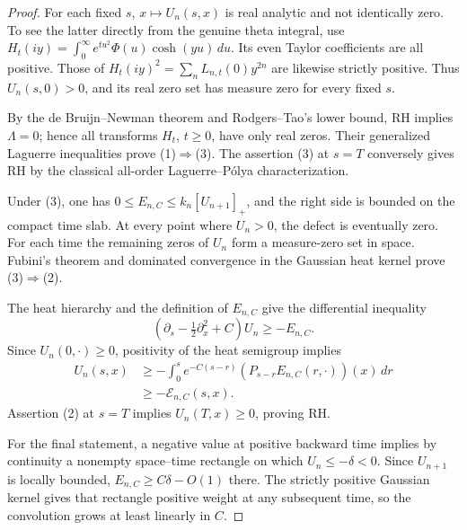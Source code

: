 \begin{proof}
For each fixed $s$, $x\mapsto U_n(s,x)$
is real analytic and not identically zero.
To see the latter directly from the genuine
theta integral, use
$H_t(iy)=\int_0^\infty e^{tu^2}\Phi(u)
\cosh(yu)\,du$. Its even Taylor coefficients
are all positive. Those of
$H_t(iy)^2=\sum_nL_{n,t}(0)y^{2n}$
are likewise strictly positive. Thus
$U_n(s,0)>0$, and its real zero set
has measure zero for every fixed $s$.

By the de Bruijn--Newman theorem and
Rodgers--Tao's lower bound, RH implies
$\Lambda=0$; hence all transforms
$H_t$, $t\ge0$, have only real zeros.
Their generalized Laguerre
inequalities prove (1)$\Rightarrow$(3).
The assertion (3) at $s=T$ conversely
gives RH by the classical all-order
Laguerre--P\'olya characterization.

Under (3), one has
$0\le E_{n,C}\le k_n[U_{n+1}]_+$,
and the right side is bounded on the
compact time slab. At every point where
$U_n>0$, the defect is eventually zero.
For each time the remaining zeros of
$U_n$ form a measure-zero set in space.
Fubini's theorem and dominated
convergence in the Gaussian heat kernel
prove (3)$\Rightarrow$(2).

The heat hierarchy and the definition
of $E_{n,C}$ give the differential
inequality
\[
(\partial_s-\tfrac12\partial_x^2+C)U_n
\ge-E_{n,C}.
\]
Since $U_n(0,\cdot)\ge0$, positivity
of the heat semigroup implies
\begin{align}
U_n(s,x)
&\ge-\int_0^s e^{-C(s-r)}
(P_{s-r}E_{n,C}(r,\cdot))(x)\,dr
\nonumber\\
&\ge-\mathcal E_{n,C}(s,x).
\label{eq:penalty-barrier}
\end{align}
Assertion (2) at $s=T$ implies
$U_n(T,x)\ge0$, proving RH.

For the final statement, a negative
value at positive backward time
implies by continuity a nonempty
space--time rectangle on which
$U_n\le-\delta<0$.
Since $U_{n+1}$ is locally bounded,
$E_{n,C}\ge C\delta-O(1)$ there.
The strictly positive Gaussian
kernel gives that rectangle
positive weight at any subsequent
time, so the convolution grows
at least linearly in $C$.
\end{proof}

